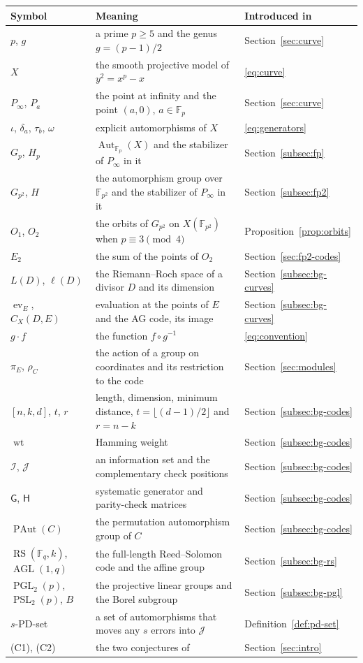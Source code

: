 \documentclass[12pt,letterpaper]{article}
\theoremstyle{definition}
\theoremstyle{remark}
\numberwithin{equation}{section}
\newcommand{\F}{\mathbb{F}}
\newcommand{\Aut}{\operatorname{Aut}}
\newcommand{\ev}{\operatorname{ev}}
\newcommand{\wt}{\operatorname{wt}}
\newcommand{\RS}{\operatorname{RS}}
\newcommand{\PAut}{\operatorname{PAut}}
\newcommand{\AGL}{\operatorname{AGL}}
\newcommand{\PSL}{\operatorname{PSL}}
\newcommand{\PGL}{\operatorname{PGL}}
\newcommand{\Gsys}{\mathsf{G}}
\newcommand{\Hsys}{\mathsf{H}}
\newcommand{\cI}{\mathcal{I}}
\newcommand{\cJ}{\mathcal{J}}
\begin{document}
\begin{center}\small
\begin{tabular}{@{}l>{\raggedright\arraybackslash}p{}l@{}}
\toprule
Symbol & Meaning & Introduced in\\
\midrule
$p$, $g$ & a prime $p\ge5$ and the genus $g=(p-1)/2$ & Section~\ref{sec:curve}\\
$X$ & the smooth projective model of $y^2=x^p-x$ & \eqref{eq:curve}\\
$P_\infty$, $P_a$ & the point at infinity and the point $(a,0)$, $a\in\F_p$ & Section~\ref{sec:curve}\\
$\iota$, $\delta_a$, $\tau_b$, $\omega$ & explicit automorphisms of $X$ & \eqref{eq:generators}\\
$G_p$, $H_p$ & $\Aut_{\F_p}(X)$ and the stabilizer of $P_\infty$ in it & Section~\ref{subsec:fp}\\
$G_{p^2}$, $H$ & the automorphism group over $\F_{p^2}$ and the stabilizer of $P_\infty$ in it & Section~\ref{subsec:fp2}\\
$O_1$, $O_2$ & the orbits of $G_{p^2}$ on $X(\F_{p^2})$ when $p\equiv3\pmod4$ & Proposition~\ref{prop:orbits}\\
$E_2$ & the sum of the points of $O_2$ & Section~\ref{sec:fp2-codes}\\
$L(D)$, $\ell(D)$ & the Riemann--Roch space of a divisor $D$ and its dimension & Section~\ref{subsec:bg-curves}\\
$\ev_E$, $C_X(D,E)$ & evaluation at the points of $E$ and the AG code, its image & Section~\ref{subsec:bg-curves}\\
$g\cdot f$ & the function $f\circ g^{-1}$ & \eqref{eq:convention}\\
$\pi_E$, $\rho_C$ & the action of a group on coordinates and its restriction to the code & Section~\ref{sec:modules}\\
$[n,k,d]$, $t$, $r$ & length, dimension, minimum distance, $t=\lfloor(d-1)/2\rfloor$ and $r=n-k$ & Section~\ref{subsec:bg-codes}\\
$\wt$ & Hamming weight & Section~\ref{subsec:bg-codes}\\
$\cI$, $\cJ$ & an information set and the complementary check positions & Section~\ref{subsec:bg-codes}\\
$\Gsys$, $\Hsys$ & systematic generator and parity-check matrices & Section~\ref{subsec:bg-codes}\\
$\PAut(C)$ & the permutation automorphism group of $C$ & Section~\ref{subsec:bg-codes}\\
$\RS(\F_q,k)$, $\AGL(1,q)$ & the full-length Reed--Solomon code and the affine group & Section~\ref{subsec:bg-rs}\\
$\PGL_2(p)$, $\PSL_2(p)$, $B$ & the projective linear groups and the Borel subgroup & Section~\ref{subsec:bg-pgl}\\
$s$-PD-set & a set of automorphisms that moves any $s$ errors into $\cJ$ & Definition~\ref{def:pd-set}\\
(C1), (C2) & the two conjectures of~\cite{Jo05} & Section~\ref{sec:intro}\\
\bottomrule
\end{tabular}
\end{center}
\end{document}
